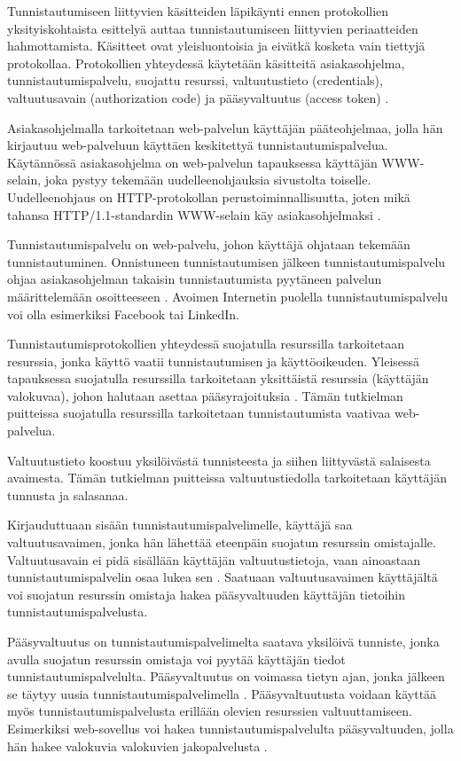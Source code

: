 Tunnistautumiseen liittyvien käsitteiden läpikäynti ennen protokollien yksityiskohtaista esittelyä auttaa tunnistautumiseen liittyvien periaatteiden hahmottamista. Käsitteet ovat yleisluontoisia ja eivätkä kosketa vain tiettyjä protokollaa. Protokollien yhteydessä käytetään käsitteitä asiakasohjelma, tunnistautumispalvelu, suojattu resurssi, valtuutustieto (credentials), valtuutusavain (authorization code) ja pääsyvaltuutus (access token) \cite{nisti}.

Asiakasohjelmalla tarkoitetaan web-palvelun käyttäjän pääteohjelmaa, jolla hän kirjautuu web-palveluun käyttäen keskitettyä tunnistautumispalvelua. Käytännössä asiakasohjelma on web-palvelun tapauksessa käyttäjän WWW-selain, joka pystyy tekemään uudelleenohjauksia sivustolta toiselle. Uudelleenohjaus on HTTP-pro\-to\-kol\-lan perustoiminnallisuutta, joten mikä tahansa HTTP/1.1-standardin WWW-selain käy asiakasohjelmaksi \cite{rfc2616}.

Tunnistautumispalvelu on web-palvelu, johon käyttäjä ohjataan tekemään tunnistautuminen. Onnistuneen tunnistautumisen jälkeen tunnistautumispalvelu ohjaa asi\-a\-kas\-oh\-jel\-man takaisin tunnistautumista pyytäneen palvelun määrittelemään osoitteeseen \cite{nisti}. Avoimen Internetin puolella tunnistautumispalvelu voi olla esimerkiksi Facebook tai LinkedIn.

Tunnistautumisprotokollien yhteydessä suojatulla resurssilla tarkoitetaan resurssia, jonka käyttö vaatii tunnistautumisen ja käyttöoikeuden. Yleisessä tapauksessa suojatulla resurssilla tarkoitetaan yksittäistä resurssia (käyttäjän valokuvaa), johon halutaan asettaa pääsyrajoituksia \cite{nisti}. Tämän tutkielman puitteissa suojatulla resurssilla tarkoitetaan tunnistautumista vaativaa web-palvelua.

Valtuutustieto koostuu yksilöivästä tunnisteesta ja siihen liittyvästä salaisesta avaimesta. Tämän tutkielman puitteissa valtuutustiedolla tarkoitetaan käyttäjän tunnusta ja salasanaa.

Kirjauduttuaan sisään tunnistautumispalvelimelle, käyttäjä saa valtuutusavaimen, jonka hän lähettää eteenpäin suojatun resurssin omistajalle. Valtuutusavain ei pidä sisällään käyttäjän valtuutustietoja, vaan ainoastaan tunnistautumispalvelin osaa lukea sen \cite{nisti}. Saatuaan valtuutusavaimen käyttäjältä voi suojatun resurssin omistaja hakea pääsyvaltuuden käyttäjän tietoihin tunnistautumispalvelusta.

Pääsyvaltuutus on tunnistautumispalvelimelta saatava yksilöivä tunniste, jonka avulla suojatun resurssin omistaja voi pyytää käyttäjän tiedot tunnistautumispalvelulta. Pääsyvaltuutus on voimassa tietyn ajan, jonka jälkeen se täytyy uusia tunnistautumispalvelimella \cite{nisti}. Pääsyvaltuutusta voidaan käyttää myös tunnistautumispalvelusta erillään olevien resurssien valtuuttamiseen. Esimerkiksi web-sovellus voi hakea tunnistautumispalvelulta pääsyvaltuuden, jolla hän hakee valokuvia valokuvien jakopalvelusta \cite{facebook}.